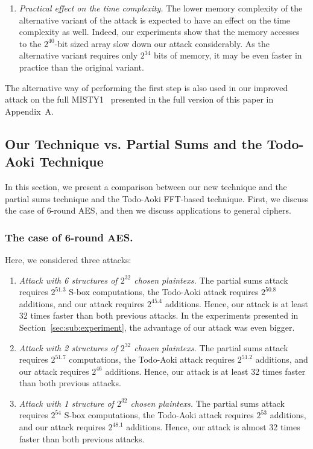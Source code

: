 \begin{enumerate}
    \item \emph{Practical effect on the time complexity.} The lower memory complexity of the alternative variant of the attack is expected to have an effect on the time complexity as well. Indeed, our experiments show that the memory accesses to the $2^{40}$-bit sized array slow down our attack considerably. As the alternative variant requires only $2^{34}$ bits of memory, it may be even faster in practice than the original variant. 
 \end{enumerate}
The alternative way of performing the first step is also used in our improved attack on the full MISTY1~\cite{MISTY1} presented in the full version of this paper \cite{fullversion} in Appendix~A.

\subsection{Our Technique vs. Partial Sums and the Todo-Aoki Technique}\label{sec:sub:comparison}

In this section, we present a comparison between our new technique and the partial sums technique and the Todo-Aoki FFT-based technique. First, we discuss the case of 6-round AES, and then we discuss applications to general ciphers.

\subsubsection{The case of 6-round AES.} Here, we considered three attacks:
\begin{enumerate}
    \item \emph{Attack with 6 structures of $2^{32}$ chosen plaintexs.} The partial sums attack requires $2^{51.3}$ S-box computations, the Todo-Aoki attack requires $2^{50.8}$ additions, and our attack requires $2^{45.4}$ additions. Hence, our attack is at least 32 times faster than both previous attacks. In the experiments presented in Section~\ref{sec:sub:experiment}, the advantage of our attack was even bigger.

    \item \emph{Attack with 2 structures of $2^{32}$ chosen plaintexs.} The partial sums attack requires $2^{51.7}$ computations, the Todo-Aoki attack requires $2^{51.2}$ additions, and our attack requires $2^{46}$ additions. Hence, our attack is at least 32 times faster than both previous attacks.

    \item \emph{Attack with 1 structure of $2^{32}$ chosen plaintexs.} The partial sums attack requires $2^{54}$ S-box computations, the Todo-Aoki attack requires $2^{53}$ additions, and our attack requires $2^{48.1}$ additions. Hence, our attack is almost 32 times faster than both previous attacks. 
\end{enumerate}

